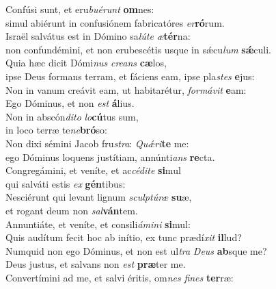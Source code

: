 \evenverse Confúsi sunt, et eru\textit{bu}\textit{é}\textit{runt} \textbf{om}nes:~\*\\
\evenverse simul abiérunt in confusiónem fabricatóres \textit{er}\textbf{ró}rum.\\
\oddverse Israël salvátus est in Dómino sa\textit{lú}\textit{te} \textit{æ}\textbf{tér}na:~\*\\
\oddverse non confundémini, et non erubescétis usque in sǽcu\textit{lum} \textbf{sǽ}culi.\\
\evenverse Quia hæc dicit Dómi\textit{nus} \textit{cre}\textit{ans} \textbf{cæ}los,~\*\\
\evenverse ipse Deus formans terram, et fáciens eam, ipse pla\textit{stes} \textbf{e}jus:\\
\oddverse Non in vanum creávit eam, ut habitarétur, \textit{for}\textit{má}\textit{vit} \textbf{e}am:~\*\\
\oddverse Ego Dóminus, et non \textit{est} \textbf{á}lius.\\
\evenverse Non in abscón\textit{di}\textit{to} \textit{lo}\textbf{cú}tus sum,~\*\\
\evenverse in loco terræ te\textit{ne}\textbf{bró}so:\\
\oddverse Non dixi sémini Jacob fru\textit{stra}: \textit{Quǽ}\textit{ri}\textbf{te} me:~\*\\
\oddverse ego Dóminus loquens justítiam, annúnti\textit{ans} \textbf{re}cta.\\
\evenverse Congregámini, et veníte, et ac\textit{cé}\textit{di}\textit{te} \textbf{si}mul~\*\\
\evenverse qui salváti estis \textit{ex} \textbf{gén}tibus:\\
\oddverse Nesciérunt qui levant lignum \textit{scul}\textit{ptú}\textit{ræ} \textbf{su}æ,~\*\\
\oddverse et rogant deum non \textit{sal}\textbf{ván}tem.\\
\evenverse Annuntiáte, et veníte, et consili\textit{á}\textit{mi}\textit{ni} \textbf{si}mul:~\*\\
\evenverse Quis audítum fecit hoc ab inítio, ex tunc prædí\textit{xit} \textbf{il}lud?\\
\oddverse Numquid non ego Dóminus, et non est ul\textit{tra} \textit{De}\textit{us} \textbf{ab}sque me?~\*\\
\oddverse Deus justus, et salvans non \textit{est} \textbf{præ}ter me.\\
\evenverse Convertímini ad me, et salvi éritis, om\textit{nes} \textit{fi}\textit{nes} \textbf{ter}ræ:~\*\\
